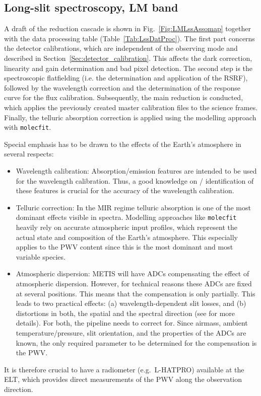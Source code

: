 \clearpage
\subsection{Long-slit spectroscopy, LM band}
\label{ssec:recipes_lss_lm}

A draft of the reduction cascade is shown in
Fig.~\ref{Fig:LMLssAssomap} together with the data processing table
(Table~\ref{Tab:LssDatProc}). The first part concerns the detector
calibrations, which are independent of the observing mode and 
described in Section~\ref{Sec:detector_calibration}. This affects the
dark correction, linearity and gain determination and bad pixel
detection. The second step is the spectroscopic flatfielding (i.e. the determination and application of the \ac{RSRF}), followed by the wavelength correction and the determination of the response curve for the flux calibration. Subsequently, the main reduction is conducted, which applies the previously created master calibration files to the science frames. Finally, the telluric absorption correction is applied using the modelling approach with \texttt{molecfit}.

Special emphasis has to be drawn to the effects of the Earth's
atmosphere in several respects:
\begin{itemize}
\item Wavelength calibration: Absorption/emission features are intended to be
  used for the wavelength calibration. Thus, a good knowledge on /
  identification of these features is crucial for the accuracy of the
  wavelength calibration.
\item Telluric correction: In the MIR regime telluric absorption is
  one of the most dominant effects visible in spectra. Modelling
  approaches like \texttt{molecfit} heavily rely on accurate
  atmospheric input profiles, which represent the actual state and
  composition of the Earth's atmosphere. This especially applies to
  the \ac{PWV} content since this is the most
  dominant and most variable species.
\item Atmospheric dispersion: \ac{METIS} will have \ac{ADC}s compensating the
  effect of atmospheric dispersion. However, for technical reasons
  these ADCs are fixed at several positions. This means that the
  compensation is only partially. This leads to two practical effects:
  (a) wavelength-dependent slit losses, and (b) distortions in both,
  the spatial and the spectral direction (see \cite{METIS-ADC_study}
  for more details). For both, the pipeline needs to correct
  for. Since airmass, ambient temperature/pressure, slit orientation,
  and the properties of the \ac{ADC}s are known, the only required
  parameter to be determined for the compensation is the \ac{PWV}.
\end{itemize}
It is therefore crucial to have a radiometer (e.g.\ L-HATPRO)
available at the \ac{ELT}, which provides direct measurements of the \ac{PWV}
along the observation direction.

